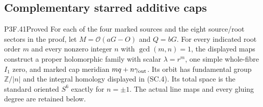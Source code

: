 \subsection{Complementary starred additive caps}

\begin{statement}{P3F.41}{Proved}
For each of the four marked sources and the eight source/root sectors in the proof, let $M=\mathcal O(aG-O)$ and $Q=bG$. For every indicated root order $m$ and every nonzero integer $n$ with $\gcd(m,n)=1$, the displayed maps construct a proper holomorphic family with scalar $\lambda=r^m$, one simple whole-fibre $I_1$ zero, and marked cap meridian $mq+n\gamma_{\rm out}$. Its orbit has fundamental group $\mathbb Z/|n|$ and the integral homology displayed in \textup{(SC.4)}. Its total space is the standard oriented $S^6$ exactly for $n=\pm1$. The actual line maps and every gluing degree are retained below.
\end{statement}
